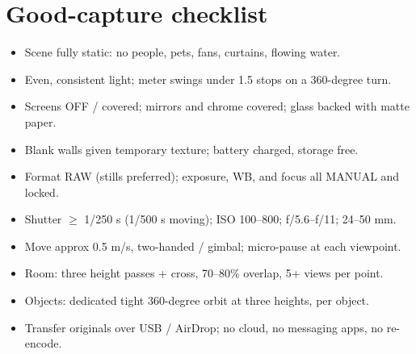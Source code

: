 \documentclass[a4paper,11pt]{article}
\begin{document}
\section{Good-capture checklist}

\begin{keyfinding}
\begin{itemize}
\item[$\square$] Scene fully static: no people, pets, fans, curtains, flowing water.
\item[$\square$] Even, consistent light; meter swings under 1.5 stops on a 360-degree turn.
\item[$\square$] Screens OFF / covered; mirrors and chrome covered; glass backed with matte paper.
\item[$\square$] Blank walls given temporary texture; battery charged, storage free.
\item[$\square$] Format RAW (stills preferred); exposure, WB, and focus all MANUAL and locked.
\item[$\square$] Shutter $\geq$ 1/250 s (1/500 s moving); ISO 100--800; f/5.6--f/11; 24--50 mm.
\item[$\square$] Move approx 0.5 m/s, two-handed / gimbal; micro-pause at each viewpoint.
\item[$\square$] Room: three height passes + cross, 70--80\% overlap, 5+ views per point.
\item[$\square$] Objects: dedicated tight 360-degree orbit at three heights, per object.
\item[$\square$] Transfer originals over USB / AirDrop; no cloud, no messaging apps, no re-encode.
\end{itemize}
\end{keyfinding}
\end{document}
